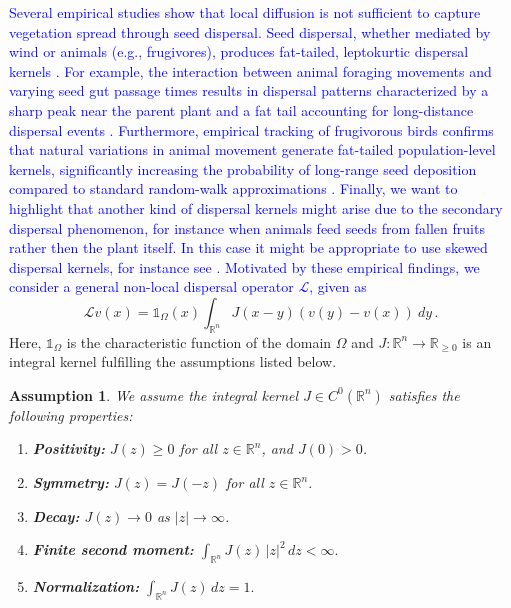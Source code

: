 \documentclass[11pt, a4paper]{article}
\makeatletter
\theoremstyle{break}
\theoremstyle{break}
\theoremstyle{break}
\newtheorem{asm}{Assumption}[section]
\theoremstyle{break}
\theoremstyle{break}
\theoremstyle{break}
\theoremstyle{break}
\theoremstyle{break}
\theoremstyle{break}
\theoremstyle{break}
\newcommand{\mylabel}[2]{#2\def\@currentlabel{#2}\label{#1}}
\makeatother
\begin{document}
\textcolor{blue}{Several empirical studies show that local diffusion is not sufficient to capture vegetation spread through seed dispersal. Seed dispersal, whether mediated by wind or animals (e.g., frugivores), produces fat-tailed, leptokurtic dispersal kernels \cite{MoralesCarlo2006, SnellEtAl2019}. For example, the interaction between animal foraging movements and varying seed gut passage times results in dispersal patterns characterized by a sharp peak near the parent plant and a fat tail accounting for long-distance dispersal events \cite{MoralesCarlo2006}. Furthermore, empirical tracking of frugivorous birds confirms that natural variations in animal movement generate fat-tailed population-level kernels, significantly increasing the probability of long-range seed deposition compared to standard random-walk approximations \cite{SnellEtAl2019}. Finally, we want to highlight that another kind of dispersal kernels might arise due to the secondary dispersal phenomenon, for instance when animals feed seeds from fallen fruits rather then the plant itself. In this case it might be appropriate to use skewed dispersal kernels, for instance see \cite{SallyGabriel2009, ConsoloValenti2019}. Motivated by these empirical findings, we consider a general non-local dispersal operator $\mathcal{L}$, given as}
\begin{equation}
    \label{eq:DispersalOperatorDefinition_1}
    \mathcal{L} v(x) = \mathds{1}_{\Omega}(x)\int_{\mathbb{R}^n} J(x-y)\left(v(y) - v(x)\right)\:dy\,.
\end{equation}
Here, $\mathds{1}_\Omega$ is the characteristic function of the domain $\Omega$ and $J : \mathbb{R}^n \rightarrow \mathbb{R}_{\geq 0}$ is an integral kernel fulfilling the assumptions listed below.

\begin{asm}
\label{assumptions_general_kernel}
We assume the integral kernel $J \in C^0(\mathbb{R}^n)$ satisfies the following properties:
\begin{enumerate}[label=\textnormal{(\arabic*)}, leftmargin=2em]
    \item[\mylabel{J1}{(J1)}] \textbf{Positivity:} 
    $J(z) \geq 0$ for all $z \in \mathbb{R}^n$, and $J(0) > 0$. 

    \item[\mylabel{J2}{(J2)}] \textbf{Symmetry:} 
    $J(z) = J(-z)$ for all $z \in \mathbb{R}^n$. 

    \item[\mylabel{J3}{(J3)}] \textbf{Decay:} 
    $J(z) \to 0$ as $|z| \to \infty$. 

    \item[\mylabel{J4}{(J4)}] \textbf{Finite second moment:} $\int_{\mathbb{R}^n} J(z)\,|z|^2 \,dz < \infty.$

    \item[\mylabel{J5}{(J5)}] \textbf{Normalization:} $\int_{\mathbb{R}^n} J(z)\,dz = 1.$
\end{enumerate}
\end{asm}
\end{document}
